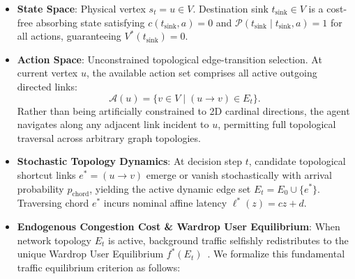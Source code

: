 \documentclass[11pt,a4paper]{article}
\begin{document}
\begin{itemize}
    \item \textbf{State Space}: Physical vertex $s_t = u \in V$. Destination sink $t_{\text{sink}} \in V$ is a cost-free absorbing state satisfying $c(t_{\text{sink}}, a) = 0$ and $\mathcal{P}(t_{\text{sink}} \mid t_{\text{sink}}, a) = 1$ for all actions, guaranteeing $V^*(t_{\text{sink}}) = 0$.
    \item \textbf{Action Space}: Unconstrained topological edge-transition selection. At current vertex $u$, the available action set comprises all active outgoing directed links:
    \begin{equation}
    \mathcal{A}(u) = \{ v \in V \mid (u \to v) \in E_t \}.
    \end{equation}
    Rather than being artificially constrained to 2D cardinal directions, the agent navigates along any adjacent link incident to $u$, permitting full topological traversal across arbitrary graph topologies.
    \item \textbf{Stochastic Topology Dynamics}: At decision step $t$, candidate topological shortcut links $e^* = (u \to v)$ emerge or vanish stochastically with arrival probability $p_{\text{chord}}$, yielding the active dynamic edge set $E_t = E_0 \cup \{e^*\}$. Traversing chord $e^*$ incurs nominal affine latency $\ell^*(z) = c z + d$.
    \item \textbf{Endogenous Congestion Cost \& Wardrop User Equilibrium}: When network topology $E_t$ is active, background traffic selfishly redistributes to the unique Wardrop User Equilibrium $f^*(E_t)$~\cite{wardrop1952road}. We formalize this fundamental traffic equilibrium criterion as follows:


\end{itemize}
\end{document}
